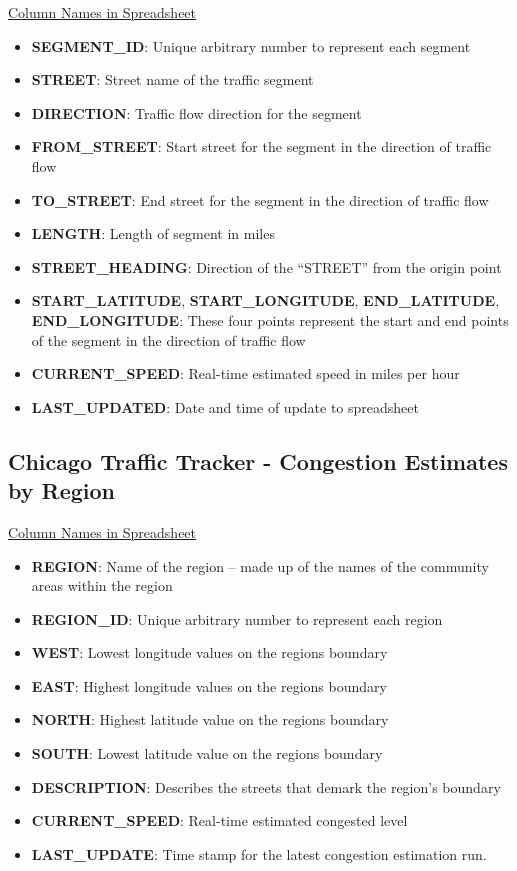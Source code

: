 \documentclass[titlepage,twocolumn]{article}
\begin{document}
\underline{Column Names in Spreadsheet}
\begin{itemize}
	\item \textbf{SEGMENT\_ID}: Unique arbitrary number to represent each segment
	\item \textbf{STREET}: Street name of the traffic segment
	\item \textbf{DIRECTION}: Traffic flow direction for the segment
	\item \textbf{FROM\_STREET}: Start street for the segment in the direction of traffic flow
	\item \textbf{TO\_STREET}: End street for the segment in the direction of traffic flow
	\item \textbf{LENGTH}: Length of segment in miles
	\item \textbf{STREET\_HEADING}: Direction of the “STREET” from the origin point
	\item \textbf{START\_LATITUDE}, \textbf{START\_LONGITUDE}, \textbf{END\_LATITUDE}, \textbf{END\_LONGITUDE}: These four points represent the start and end points of the segment in the direction of traffic flow
	\item \textbf{CURRENT\_SPEED}: Real-time estimated speed in miles per hour
	\item \textbf{LAST\_UPDATED}: Date and time of update to spreadsheet
\end{itemize}

\subsection{Chicago Traffic Tracker - Congestion Estimates by Region}
\label{app:regionCTT}

\underline{Column Names in Spreadsheet}
\begin{itemize}
	\item \textbf{REGION}: Name of the region – made up of the names of the community areas within the region
	\item \textbf{REGION\_ID}: Unique arbitrary number to represent each region
	\item \textbf{WEST}: Lowest longitude values on the regions boundary
	\item \textbf{EAST}: Highest longitude values on the regions boundary
	\item \textbf{NORTH}: Highest latitude value on the regions boundary
	\item \textbf{SOUTH}: Lowest latitude value on the regions boundary
	\item \textbf{DESCRIPTION}: Describes the streets that demark the region’s boundary
	\item \textbf{CURRENT\_SPEED}: Real-time estimated congested level
	\item \textbf{LAST\_UPDATE}: Time stamp for the latest congestion estimation run.
\end{itemize}
\end{document}

